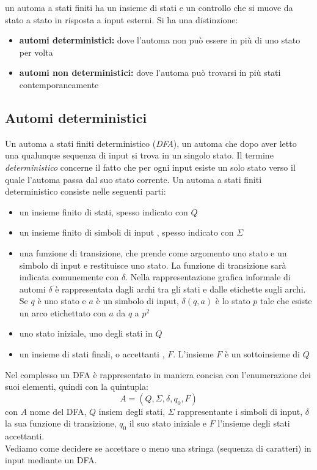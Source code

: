 
un automa a stati finiti ha un insieme di stati e un controllo che si muove da stato a stato in risposta a input esterni. Si ha una distinzione:
\begin{itemize}
\item \textbf{automi deterministici:} dove l'automa non può essere in più di uno stato per volta
\item \textbf{automi non deterministici:} dove l'automa può trovarsi in più stati contemporaneamente
\end{itemize}
\subsection{Automi deterministici}
Un automa a stati finiti deterministico (\textit{DFA}), un automa che dopo aver letto una qualunque sequenza di input si trova in un singolo stato. Il termine \textit{deterministico} concerne il fatto che per ogni input esiste un solo stato verso il quale l'automa passa dal suo stato corrente. Un automa a stati finiti deterministico consiste nelle seguenti parti:
\begin{itemize}
\item un insieme finito di stati, spesso indicato con $Q$
\item un insieme finito di simboli di input , spesso indicato con $\Sigma$
\item una funzione di transizione, che prende come argomento uno stato e un simbolo di input e restituisce uno stato. La funzione di transizione sarà indicata comunemente con $\delta$. Nella rappresentazione grafica informale di automi $\delta$ è rappresentata dagli archi tra gli stati e dalle etichette sugli archi. Se $q$ è uno stato e $a$ è un simbolo di input, $\delta(q,a)$ è lo stato $p$ tale che esiste un arco etichettato con $a$ da $q$ a $p^2$
\item uno stato iniziale, uno degli stati in $Q$
\item un insieme di stati finali, o accettanti , $F$. L'insieme $F$ è un sottoinsieme di $Q$
\end{itemize}
Nel complesso un DFA è rappresentato in maniera concisa con l'enumerazione dei suoi elementi, quindi con la quintupla:
$$A=(Q,\Sigma,\delta,q_0,F)$$
con $A$ nome del DFA, $Q$ insiem degli stati, $\Sigma$ rappresentante i simboli di input, $\delta$ la sua funzione di transizione, $q_0$ il suo stato iniziale e $F$ l'insieme degli stati accettanti.\\
Vediamo come decidere se accettare o meno una stringa (sequenza di caratteri) in input mediante un DFA.\\
